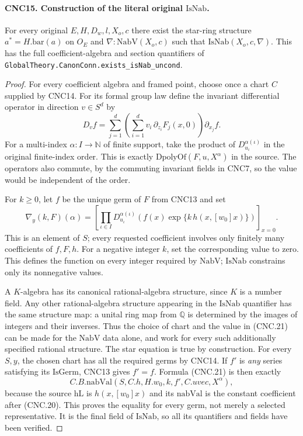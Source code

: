 \documentclass[11pt,a4paper]{article}
\numberwithin{equation}{section}
\theoremstyle{remark}\newtheorem{remark}[theorem]{Remark}
\begin{document}
\paragraph{CNC15. Construction of the literal original \(\mathrm{IsNab}\).}
\label{claim:CNC15}
For every original \(E,H,D_w,l,X_o,c\) there exist the star-ring
structure \(a^*=H.\mathrm{bar}(a)\) on \(O_E\) and
\(\nabla:\mathrm{NabV}(X_o,c)\) such that
\(\mathrm{IsNab}(X_o,c,\nabla)\).
This has the full coefficient-algebra and section quantifiers of
\texttt{Global\allowbreak Theory.\allowbreak Canon\allowbreak Conn.\allowbreak exists\_\allowbreak is\allowbreak Nab\_\allowbreak uncond}.
\begin{proof}
For every coefficient algebra and framed point, choose once a chart
\(C\) supplied by CNC14.  For its formal group law define the
invariant differential operator in direction \(v\in S^d\) by
\[
 D_v f=\sum_{j=1}^d\left(\sum_{i=1}^d
       v_i\,\partial_{z_i}F_j(x,0)\right)\partial_{x_j}f.
                                                               \tag{CNC.20}
\]
For a multi-index \(\alpha:I\to\mathbb N\) of finite support,
take the product of \(D_{u_\iota}^{\alpha(\iota)}\) in the
original finite-index order.  This is exactly
\(\mathrm{DpolyOf}(F,u,X^\alpha)\) in the source.  The operators
also commute, by the commuting invariant fields in CNC7, so the value
would be independent of the order.

For \(k\geq0\), let \(f\) be the unique germ of \(F\) from
CNC13 and set
\[
 \nabla_y(k,F)(\alpha)=
 \left[\prod_{\iota\in I}D_{u_\iota}^{\alpha(\iota)}
    \left(f(x)\exp\{k\,h(x,[w_0]x)\}\right)\right]_{x=0}.
                                                               \tag{CNC.21}
\]
This is an element of \(S\); every requested coefficient involves
only finitely many coefficients of \(f,F,h\).
For a negative integer \(k\), set the corresponding value to zero.
This defines the function on every integer required by
\(\mathrm{NabV}\); \(\mathrm{IsNab}\) constrains only its
nonnegative values.

A \(K\)-algebra has its canonical rational-algebra structure, since
\(K\) is a number field.  Any other rational-algebra structure appearing
in the \(\mathrm{IsNab}\) quantifier has the same structure map:
a unital ring map from \(\mathbb Q\) is determined by the images
of integers and their inverses.  Thus the choice of chart and the value
in (CNC.21) can be made for the \(\mathrm{NabV}\) data alone,
and work for every such additionally specified rational structure.
The star equation is true by construction.  For every \(S,y\), the
chosen chart has all the required germs by CNC14.  If \(f'\) is
\emph{any} series satisfying its \(\mathrm{IsGerm}\), CNC13
gives \(f'=f\).  Formula (CNC.21) is then exactly
\[
 C.B.\mathrm{nabVal}(S,C.h,H.w_0,k,f',C.uvec,X^\alpha),
\]
because the source \(\mathrm{hL}\) is \(h(x,[w_0]x)\) and
its \(\mathrm{nabVal}\) is the constant coefficient after
(CNC.20).  This proves the equality for every germ, not merely a selected
representative.  It is the final field of \(\mathrm{IsNab}\),
so all its quantifiers and fields have been verified.
\end{proof}
\end{document}
